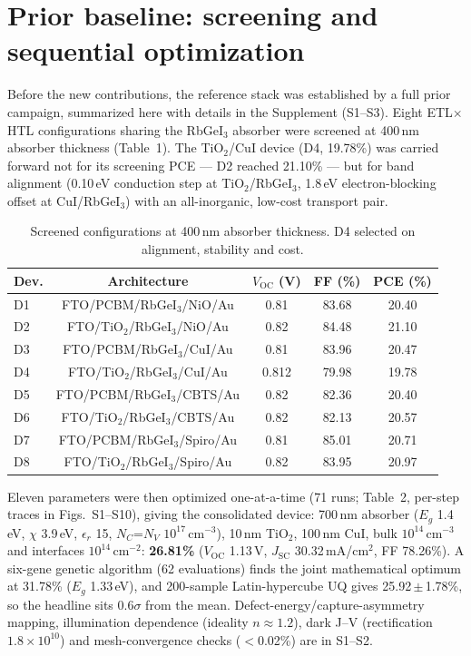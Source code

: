 \documentclass[review]{elsarticle}
\begin{document}
\section{Prior baseline: screening and sequential optimization}
Before the new contributions, the reference stack was established by a full prior campaign, summarized here with details in the Supplement (S1--S3).
Eight ETL$\times$HTL configurations sharing the RbGeI$_{3}$ absorber were screened at 400\,nm absorber thickness (Table~1). The TiO$_{2}$/CuI device (D4, 19.78\%) was carried forward not for its screening PCE --- D2 reached 21.10\% --- but for band alignment (0.10\,eV conduction step at TiO$_{2}$/RbGeI$_{3}$, 1.8\,eV electron-blocking offset at CuI/RbGeI$_{3}$) with an all-inorganic, low-cost transport pair.
\begin{table}[htbp]
\centering
{\footnotesize\setlength{\tabcolsep}{3pt}
\begin{tabularx}{\textwidth}{Xcccc}
\hline
Dev. & Architecture & $V_{\mathrm{OC}}$ (V) & FF (\%) & PCE (\%)\\
\hline
D1 & FTO/PCBM/RbGeI$_{3}$/NiO/Au & 0.81 & 83.68 & 20.40\\
D2 & FTO/TiO$_{2}$/RbGeI$_{3}$/NiO/Au & 0.82 & 84.48 & 21.10\\
D3 & FTO/PCBM/RbGeI$_{3}$/CuI/Au & 0.81 & 83.96 & 20.47\\
D4 & FTO/TiO$_{2}$/RbGeI$_{3}$/CuI/Au & 0.812 & 79.98 & 19.78\\
D5 & FTO/PCBM/RbGeI$_{3}$/CBTS/Au & 0.82 & 82.36 & 20.40\\
D6 & FTO/TiO$_{2}$/RbGeI$_{3}$/CBTS/Au & 0.82 & 82.13 & 20.57\\
D7 & FTO/PCBM/RbGeI$_{3}$/Spiro/Au & 0.81 & 85.01 & 20.71\\
D8 & FTO/TiO$_{2}$/RbGeI$_{3}$/Spiro/Au & 0.82 & 83.95 & 20.97\\
\hline
\end{tabularx}}
\caption{Screened configurations at 400\,nm absorber thickness. D4 selected on alignment, stability and cost.}
\end{table}
Eleven parameters were then optimized one-at-a-time (71 runs; Table~2, per-step traces in Figs.~S1--S10), giving the consolidated device: 700\,nm absorber ($E_{g}$ 1.4\,eV, $\chi$ 3.9\,eV, $\epsilon_{r}$ 15, $N_{C}$=$N_{V}$ $10^{17}$\,cm$^{-3}$), 10\,nm TiO$_{2}$, 100\,nm CuI, bulk $10^{14}$\,cm$^{-3}$ and interfaces $10^{14}$\,cm$^{-2}$: \textbf{26.81\%} ($V_{\mathrm{OC}}$ 1.13\,V, $J_{\mathrm{SC}}$ 30.32\,mA/cm$^{2}$, FF 78.26\%). A six-gene genetic algorithm (62 evaluations) finds the joint mathematical optimum at 31.78\% ($E_{g}$ 1.33\,eV), and 200-sample Latin-hypercube UQ gives 25.92\,$\pm$\,1.78\%, so the headline sits 0.6$\sigma$ from the mean. Defect-energy/capture-asymmetry mapping, illumination dependence (ideality $n\!\approx\!1.2$), dark J--V (rectification $1.8\times10^{10}$) and mesh-convergence checks ($<$0.02\%) are in S1--S2.
\end{document}
